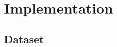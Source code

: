 \documentclass{beamer}
\begin{document}

\section[Implementation]{Implementation}

\subsection{Dataset}
\end{document}
